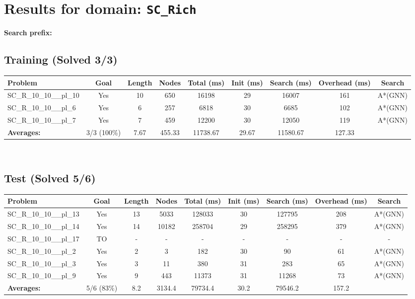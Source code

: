 \documentclass{article}
\begin{document}
\section*{Results for domain: \texttt{SC\_Rich}}
\textbf{Search prefix:} 
\\[0.5cm]
\subsection*{Training (Solved 3/3)}
\begin{tabular}{lcccccccc}
\toprule
Problem & Goal & Length & Nodes & Total (ms) & Init (ms) & Search (ms) & Overhead (ms) & Search \\
\midrule
SC\_R\_10\_10\_\_pl\_10 & Yes & 10 & 650 & 16198 & 29 & 16007 & 161 & A*(GNN) \\
SC\_R\_10\_10\_\_pl\_6 & Yes & 6 & 257 & 6818 & 30 & 6685 & 102 & A*(GNN) \\
SC\_R\_10\_10\_\_pl\_7 & Yes & 7 & 459 & 12200 & 30 & 12050 & 119 & A*(GNN) \\
\textbf{Averages:} & 3/3 (100\%) & 7.67 & 455.33 & 11738.67 & 29.67 & 11580.67 & 127.33 & \\
\bottomrule
\end{tabular}
\\[0.7cm]
\subsection*{Test (Solved 5/6)}
\begin{tabular}{lcccccccc}
\toprule
Problem & Goal & Length & Nodes & Total (ms) & Init (ms) & Search (ms) & Overhead (ms) & Search \\
\midrule
SC\_R\_10\_10\_\_pl\_13 & Yes & 13 & 5033 & 128033 & 30 & 127795 & 208 & A*(GNN) \\
SC\_R\_10\_10\_\_pl\_14 & Yes & 14 & 10182 & 258704 & 29 & 258295 & 379 & A*(GNN) \\
SC\_R\_10\_10\_\_pl\_17 & TO & - & - & - & - & - & - & - \\
SC\_R\_10\_10\_\_pl\_2 & Yes & 2 & 3 & 182 & 30 & 90 & 61 & A*(GNN) \\
SC\_R\_10\_10\_\_pl\_3 & Yes & 3 & 11 & 380 & 31 & 283 & 65 & A*(GNN) \\
SC\_R\_10\_10\_\_pl\_9 & Yes & 9 & 443 & 11373 & 31 & 11268 & 73 & A*(GNN) \\
\textbf{Averages:} & 5/6 (83\%) & 8.2 & 3134.4 & 79734.4 & 30.2 & 79546.2 & 157.2 & \\
\bottomrule
\end{tabular}
\\[0.7cm]
\end{document}
